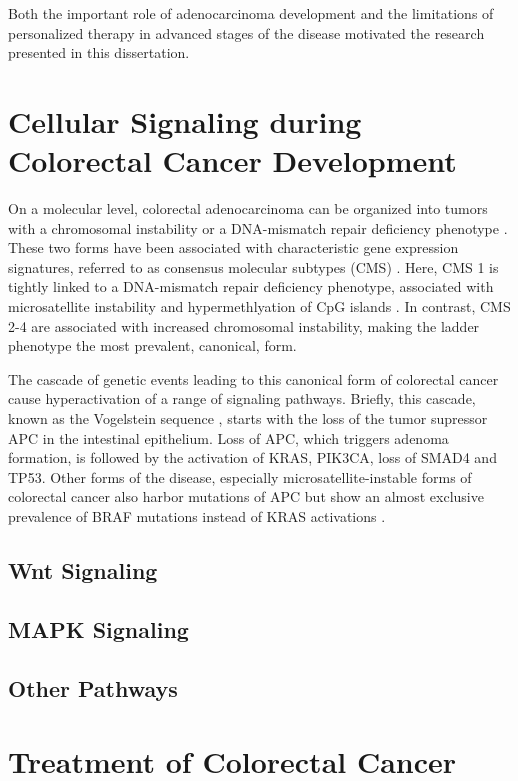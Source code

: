 \begin{flushleft}
Both the important role of adenocarcinoma development and the limitations of personalized therapy in advanced stages of the disease motivated the research presented in this dissertation.\par

\section{Cellular Signaling during Colorectal Cancer Development}

On a molecular level, colorectal adenocarcinoma can be organized into tumors with a chromosomal instability or a DNA-mismatch repair deficiency phenotype \cite{Markowitz2009}. These two forms have been associated with characteristic gene expression signatures, referred to as consensus molecular subtypes (CMS) \cite{Guinney2015TheCancer.}. Here, CMS 1 is tightly linked to a DNA-mismatch repair deficiency phenotype, associated with microsatellite instability and hypermethlyation of CpG islands \cite{Markowitz2009}. In contrast, CMS 2-4 are associated with increased chromosomal instability, making the ladder phenotype the most prevalent, canonical, form. 

The cascade of genetic events leading to this canonical form of colorectal cancer cause hyperactivation of a range of signaling pathways. Briefly, this cascade, known as the Vogelstein sequence \cite{Cho1992}, starts with the loss of the tumor supressor APC in the intestinal epithelium. Loss of APC, which triggers adenoma formation, is followed by the activation of KRAS, PIK3CA, loss of SMAD4 and TP53. Other forms of the disease, especially microsatellite-instable forms of colorectal cancer also harbor mutations of APC but show an almost exclusive prevalence of BRAF mutations instead of KRAS activations \cite{Guinney2015TheCancer.}.

\subsection{Wnt Signaling} %
\subsection{MAPK Signaling}
\subsection{Other Pathways}
\section{Treatment of Colorectal Cancer}

\end{flushleft}
